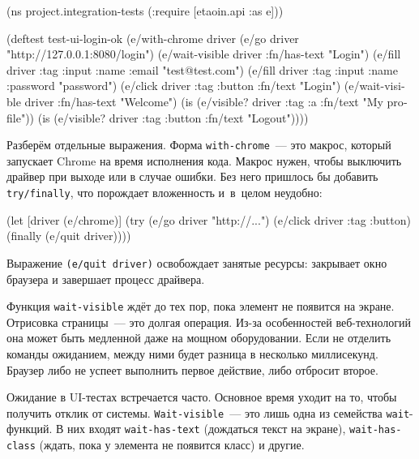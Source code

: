 \else

\begin{english}
  \begin{clojure}
(ns project.integration-tests
  (:require [etaoin.api :as e]))

(deftest test-ui-login-ok
  (e/with-chrome {} driver
    (e/go driver "http://127.0.0.1:8080/login")
    (e/wait-visible driver {:fn/has-text "Login"})
    (e/fill driver
       {:tag :input :name :email} "test@test.com")
    (e/fill driver
       {:tag :input :name :password} "password")
    (e/click driver {:tag :button :fn/text "Login"})
    (e/wait-visible driver {:fn/has-text "Welcome"})
    (is (e/visible? driver
           {:tag :a :fn/text "My profile"}))
    (is (e/visible? driver
           {:tag :button :fn/text "Logout"}))))
  \end{clojure}
\end{english}

\fi

\fi

Разберём отдельные выражения. Форма \verb|with-chrome|~--- это макрос, который
запускает Chrome на время исполнения кода. Макрос нужен, чтобы выключить драйвер
при выходе или в случае ошибки. Без него пришлось бы добавить
\verb|try/finally|, что порождает вложенность и~в~целом неудобно:


\begin{english}
  \begin{clojure}
(let [driver (e/chrome)]
  (try
    (e/go driver "http://...")
    (e/click driver {:tag :button})
    (finally
      (e/quit driver))))
  \end{clojure}
\end{english}

Выражение \verb|(e/quit driver)| освобождает занятые ресурсы: закрывает окно
браузера и завершает процесс драйвера.

Функция \verb|wait-visible| ждёт до тех пор, пока элемент не появится на
экране. Отрисовка страницы~--- это долгая операция. Из-за особенностей
веб-технологий она может быть медленной даже на мощном оборудовании. Если не
отделить команды ожиданием, между ними будет разница в несколько
миллисекунд. Браузер либо не успеет выполнить первое действие, либо отбросит
второе.

Ожидание в UI-тестах встречается часто. Основное время уходит на то, чтобы
получить отклик от системы. \verb|Wait-visible|~--- это лишь одна из семейства
\verb|wait|-функций. В них входят \texttt{wait\--has\--text} (дождаться текст на
экране), \verb|wait-has-class| (ждать, пока у элемента не появится класс) и
другие.


